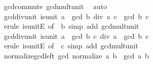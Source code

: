 \begin{isabellebody}
%
\isatagproof
{}\isamarkupfalse%
\ gcd{\isachardot}{\kern0pt}commute\ gcd{\isacharunderscore}{\kern0pt}mult{\isacharunderscore}{\kern0pt}unit{}\ \isamarkupfalse%
\ auto%
\endisatagproof
{\isafoldproof}%
%
\isadelimproof
\isanewline
%
\endisadelimproof
\isanewline
{}\isamarkupfalse%
\ gcd{\isacharunderscore}{\kern0pt}div{\isacharunderscore}{\kern0pt}unit{}{\isacharcolon}{\kern0pt}\ {\isachardoublequoteopen}is{\isacharunderscore}{\kern0pt}unit\ a\ {\isasymLongrightarrow}\ gcd\ {\isacharparenleft}{\kern0pt}b\ div\ a{\isacharparenright}{\kern0pt}\ c\ {\isacharequal}{\kern0pt}\ gcd\ b\ c{\isachardoublequoteclose}\isanewline
%
\isadelimproof
\ \ %
\endisadelimproof
%
\isatagproof
{}\isamarkupfalse%
\ {\isacharparenleft}{\kern0pt}erule\ is{\isacharunderscore}{\kern0pt}unitE\ {\isacharbrackleft}{\kern0pt}of\ {\isacharunderscore}{\kern0pt}\ b{\isacharbrackright}{\kern0pt}{\isacharparenright}{\kern0pt}\ {\isacharparenleft}{\kern0pt}simp\ add{\isacharcolon}{\kern0pt}\ gcd{\isacharunderscore}{\kern0pt}mult{\isacharunderscore}{\kern0pt}unit{}{\isacharparenright}{\kern0pt}%
\endisatagproof
{\isafoldproof}%
%
\isadelimproof
\isanewline
%
\endisadelimproof
\isanewline
{}\isamarkupfalse%
\ gcd{\isacharunderscore}{\kern0pt}div{\isacharunderscore}{\kern0pt}unit{}{\isacharcolon}{\kern0pt}\ {\isachardoublequoteopen}is{\isacharunderscore}{\kern0pt}unit\ a\ {\isasymLongrightarrow}\ gcd\ b\ {\isacharparenleft}{\kern0pt}c\ div\ a{\isacharparenright}{\kern0pt}\ {\isacharequal}{\kern0pt}\ gcd\ b\ c{\isachardoublequoteclose}\isanewline
%
\isadelimproof
\ \ %
\endisadelimproof
%
\isatagproof
{}\isamarkupfalse%
\ {\isacharparenleft}{\kern0pt}erule\ is{\isacharunderscore}{\kern0pt}unitE\ {\isacharbrackleft}{\kern0pt}of\ {\isacharunderscore}{\kern0pt}\ c{\isacharbrackright}{\kern0pt}{\isacharparenright}{\kern0pt}\ {\isacharparenleft}{\kern0pt}simp\ add{\isacharcolon}{\kern0pt}\ gcd{\isacharunderscore}{\kern0pt}mult{\isacharunderscore}{\kern0pt}unit{}{\isacharparenright}{\kern0pt}%
\endisatagproof
{\isafoldproof}%
%
\isadelimproof
\isanewline
%
\endisadelimproof
\isanewline
{}\isamarkupfalse%
\ normalize{\isacharunderscore}{\kern0pt}gcd{\isacharunderscore}{\kern0pt}left{\isacharcolon}{\kern0pt}\ {\isachardoublequoteopen}gcd\ {\isacharparenleft}{\kern0pt}normalize\ a{\isacharparenright}{\kern0pt}\ b\ {\isacharequal}{\kern0pt}\ gcd\ a\ b{\isachardoublequoteclose}\isanewline
%
\isadelimproof
\ \ %
\endisadelimproof
%
\isatagproof

\end{isabellebody}
